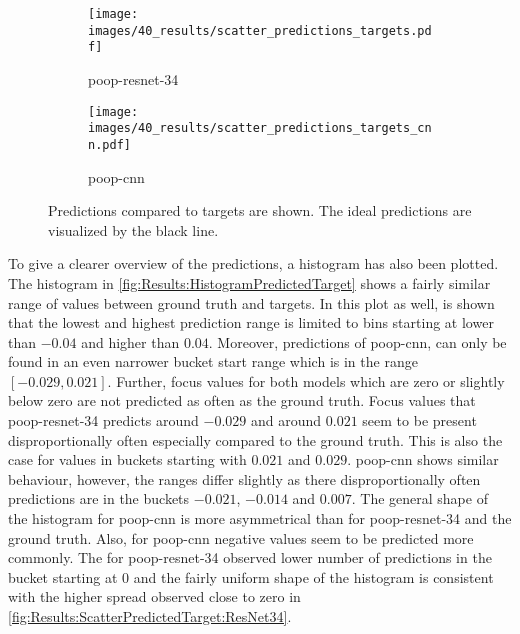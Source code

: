 \begin{figure}
    \centering
    \begin{subfigure}[b]{0.5\textwidth}
        \texttt{[image: images/40\_results/scatter\_predictions\_targets.pdf]}
        \caption{\acs{poop}-\acs{resnet}-34}
        \label{fig:Results:ScatterPredictedTarget:ResNet34}
    \end{subfigure}%
    \begin{subfigure}[b]{0.5\textwidth}
        \texttt{[image: images/40\_results/scatter\_predictions\_targets\_cnn.pdf]}
        \caption{\acs{poop}-\acs{cnn}}
        \label{fig:Results:ScatterPredictedTarget:CNN}
    \end{subfigure}
    \caption[Model predictions compared with targets]{Predictions compared to targets are shown. The ideal predictions are visualized by the black line.}
    \label{fig:Results:ScatterPredictedTarget}
\end{figure}

To give a clearer overview of the predictions, a histogram has also been plotted. The histogram in \autoref{fig:Results:HistogramPredictedTarget} shows a fairly similar range of values between ground truth and targets.
In this plot as well, is shown that the lowest and highest prediction range is limited to bins starting at lower than $-0.04$ and higher than $0.04$. Moreover, predictions of \ac{poop}-\ac{cnn}, can only be found in an even narrower bucket start range which is in the range $[-0.029, 0.021]$. Further, focus values for both models which are zero or slightly below zero are not predicted as often as the ground truth. Focus values that \acs{poop}-\acs{resnet}-34 predicts around $-0.029$ and around $0.021$ seem to be present disproportionally often especially compared to the ground truth. This is also the case for values in buckets starting with $0.021$ and $0.029$. \ac{poop}-\ac{cnn} shows similar behaviour, however, the ranges differ slightly as there disproportionally often predictions are in the buckets $-0.021$, $-0.014$ and $0.007$. The general shape of the histogram for \ac{poop}-\ac{cnn} is more asymmetrical than for {poop}-\acs{resnet}-34  and the ground truth. Also, for \acs{poop}-\acs{cnn} negative values seem to be predicted more commonly. The for \acs{poop}-\acs{resnet}-34 observed lower number of predictions in the bucket starting at $0$ and the fairly uniform shape of the histogram is consistent with the higher spread observed close to zero in \autoref{fig:Results:ScatterPredictedTarget:ResNet34}. 

